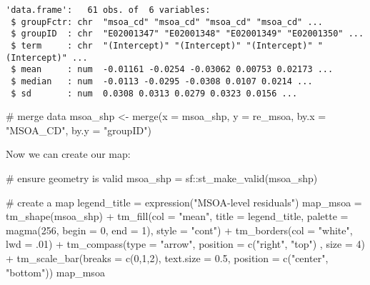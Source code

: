 \documentclass[
  letterpaper,
  krantz2]{style/krantz}
\newenvironment{Shaded}{\begin{snugshade}}{\end{snugshade}}
\newcommand{\AttributeTok}[1]{\textcolor[rgb]{0.40,0.45,0.13}{#1}}
\newcommand{\CommentTok}[1]{\textcolor[rgb]{0.37,0.37,0.37}{#1}}
\newcommand{\DecValTok}[1]{\textcolor[rgb]{0.68,0.00,0.00}{#1}}
\newcommand{\FloatTok}[1]{\textcolor[rgb]{0.68,0.00,0.00}{#1}}
\newcommand{\FunctionTok}[1]{\textcolor[rgb]{0.28,0.35,0.67}{#1}}
\newcommand{\NormalTok}[1]{\textcolor[rgb]{0.00,0.23,0.31}{#1}}
\newcommand{\OtherTok}[1]{\textcolor[rgb]{0.00,0.23,0.31}{#1}}
\newcommand{\SpecialCharTok}[1]{\textcolor[rgb]{0.37,0.37,0.37}{#1}}
\newcommand{\StringTok}[1]{\textcolor[rgb]{0.13,0.47,0.30}{#1}}
\begin{document}
\begin{verbatim}
'data.frame':   61 obs. of  6 variables:
 $ groupFctr: chr  "msoa_cd" "msoa_cd" "msoa_cd" "msoa_cd" ...
 $ groupID  : chr  "E02001347" "E02001348" "E02001349" "E02001350" ...
 $ term     : chr  "(Intercept)" "(Intercept)" "(Intercept)" "(Intercept)" ...
 $ mean     : num  -0.01161 -0.0254 -0.03062 0.00753 0.02173 ...
 $ median   : num  -0.0113 -0.0295 -0.0308 0.0107 0.0214 ...
 $ sd       : num  0.0308 0.0313 0.0279 0.0323 0.0156 ...
\end{verbatim}

\begin{Shaded}
\begin{Highlighting}[]
\CommentTok{\# merge data}
\NormalTok{msoa\_shp }\OtherTok{\textless{}{-}} \FunctionTok{merge}\NormalTok{(}\AttributeTok{x =}\NormalTok{ msoa\_shp, }\AttributeTok{y =}\NormalTok{ re\_msoa, }\AttributeTok{by.x =} \StringTok{"MSOA\_CD"}\NormalTok{, }\AttributeTok{by.y =} \StringTok{"groupID"}\NormalTok{)}
\end{Highlighting}
\end{Shaded}

Now we can create our map:

\begin{Shaded}
\begin{Highlighting}[]
\CommentTok{\# ensure geometry is valid}
\NormalTok{msoa\_shp }\OtherTok{=}\NormalTok{ sf}\SpecialCharTok{::}\FunctionTok{st\_make\_valid}\NormalTok{(msoa\_shp)}

\CommentTok{\# create a map}
\NormalTok{legend\_title }\OtherTok{=} \FunctionTok{expression}\NormalTok{(}\StringTok{"MSOA{-}level residuals"}\NormalTok{)}
\NormalTok{map\_msoa }\OtherTok{=} \FunctionTok{tm\_shape}\NormalTok{(msoa\_shp) }\SpecialCharTok{+}
  \FunctionTok{tm\_fill}\NormalTok{(}\AttributeTok{col =} \StringTok{"mean"}\NormalTok{, }\AttributeTok{title =}\NormalTok{ legend\_title, }\AttributeTok{palette =} \FunctionTok{magma}\NormalTok{(}\DecValTok{256}\NormalTok{, }\AttributeTok{begin =} \DecValTok{0}\NormalTok{, }\AttributeTok{end =} \DecValTok{1}\NormalTok{), }\AttributeTok{style =} \StringTok{"cont"}\NormalTok{) }\SpecialCharTok{+} 
  \FunctionTok{tm\_borders}\NormalTok{(}\AttributeTok{col =} \StringTok{"white"}\NormalTok{, }\AttributeTok{lwd =}\NormalTok{ .}\DecValTok{01}\NormalTok{)  }\SpecialCharTok{+} 
  \FunctionTok{tm\_compass}\NormalTok{(}\AttributeTok{type =} \StringTok{"arrow"}\NormalTok{, }\AttributeTok{position =} \FunctionTok{c}\NormalTok{(}\StringTok{"right"}\NormalTok{, }\StringTok{"top"}\NormalTok{) , }\AttributeTok{size =} \DecValTok{4}\NormalTok{) }\SpecialCharTok{+} 
  \FunctionTok{tm\_scale\_bar}\NormalTok{(}\AttributeTok{breaks =} \FunctionTok{c}\NormalTok{(}\DecValTok{0}\NormalTok{,}\DecValTok{1}\NormalTok{,}\DecValTok{2}\NormalTok{), }\AttributeTok{text.size =} \FloatTok{0.5}\NormalTok{, }\AttributeTok{position =}  \FunctionTok{c}\NormalTok{(}\StringTok{"center"}\NormalTok{, }\StringTok{"bottom"}\NormalTok{)) }
\NormalTok{map\_msoa}
\end{Highlighting}
\end{Shaded}
\end{document}
